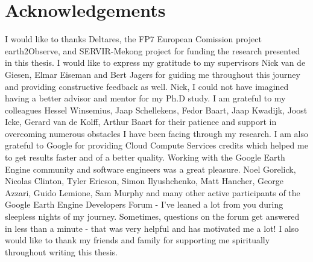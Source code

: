 \chapter*{Acknowledgements}
\label{acknowledgements}

I would like to thanks Deltares, the FP7 European Comission project earth2Observe, and SERVIR-Mekong project for funding the research presented in this thesis. I would like to express my gratitude to my supervisors Nick van de Giesen, Elmar Eiseman and Bert Jagers for guiding me throughout this journey and providing constructive feedback as well. Nick, I could not have imagined having a better advisor and mentor for my Ph.D study. I am grateful to my colleagues Hessel Winsemius, Jaap Schellekens, Fedor Baart, Jaap Kwadijk, Joost Icke, Gerard van de Kolff, Arthur Baart for their patience and support in overcoming numerous obstacles I have been facing through my research. I am also grateful to Google for providing Cloud Compute Services credits which helped me to get results faster and of a better quality. Working with the Google Earth Engine community and software engineers was a great pleasure. Noel Gorelick, Nicolas Clinton, Tyler Ericson, Simon Ilyushchenko, Matt Hancher, George Azzari, Guido Lemione, Sam Murphy and many other active participants of the Google Earth Engine Developers Forum - I've leaned a lot from you during sleepless nights of my journey. Sometimes, questions on the forum get answered in less than a minute - that was very helpful and has motivated me a lot! I also would like to thank my friends and family for supporting me spiritually throughout writing this thesis.
